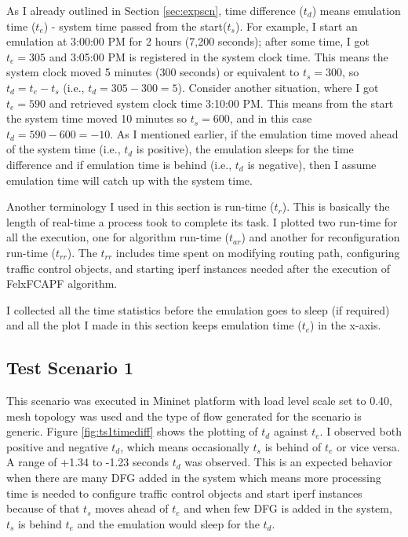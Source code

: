 As I already outlined in Section \ref{sec:expscn}, time difference ($t_d$) means emulation time ($t_e$) - system time passed from the start($t_s$). For example, I start an emulation at 3:00:00 PM for 2 hours (7,200 seconds); after some time, I got $t_e = 305$ and 3:05:00 PM is registered in the system clock time. This means the system clock moved 5 minutes (300 seconds) or equivalent to $t_s = 300$, so $t_d = t_e - t_s$ (i.e., $t_d=305-300=5$). Consider another situation, where I got $t_e=590$ and retrieved system clock time 3:10:00 PM. This means from the start the system time moved 10 minutes so $t_s=600$, and in this case $t_d=590-600=-10$. As I mentioned earlier, if the emulation time moved ahead of the system time (i.e., $t_d$ is positive), the emulation sleeps for the time difference and if emulation time is behind (i.e., $t_d$ is negative), then I assume emulation time will catch up with the system time.

Another terminology I used in this section is run-time ($t_r$). This is basically the length of real-time a process took to complete its task. I plotted two run-time for all the execution, one for algorithm run-time ($t_{ar}$) and another for reconfiguration run-time ($t_{rr}$). The $t_{rr}$ includes time spent on modifying routing path, configuring traffic control objects, and starting iperf instances needed after the execution of FelxFCAPF algorithm.

I collected all the time statistics before the emulation goes to sleep (if required) and all the plot I made in this section keeps emulation time ($t_e$) in the x-axis.

\subsection{Test Scenario 1}
This scenario was executed in Mininet platform with load level scale set to 0.40, mesh topology was used and the type of flow generated for the scenario is generic. Figure \ref{fig:ts1timediff} shows the plotting of $t_d$ against $t_e$. I observed both positive and negative $t_d$, which means occasionally $t_s$ is behind of $t_e$ or vice versa. A range of +1.34 to -1.23 seconds $t_d$ was observed. This is an expected behavior when there are many DFG added in the system which means more processing time is needed to configure traffic control objects and start iperf instances because of that $t_s$ moves ahead of $t_e$ and when few DFG is added in the system, $t_s$ is behind $t_e$ and the emulation would sleep for the $t_d$.

